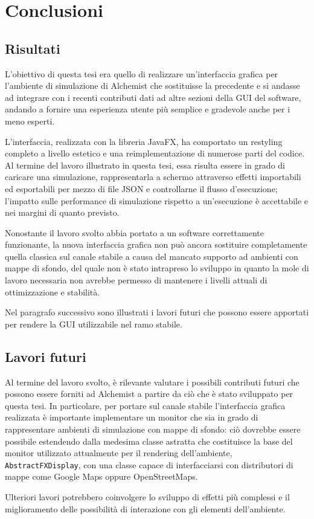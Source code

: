 
\chapter{Conclusioni}\label{ch:conclusioni}
    \section{Risultati}\label{sec:risultati}
        L'obiettivo di questa tesi era quello di realizzare un'interfaccia grafica per l'ambiente di simulazione di Alchemist che sostituisse la precedente e si andasse ad integrare con i recenti contributi dati ad altre sezioni della GUI del software, andando a fornire una esperienza utente più semplice e gradevole anche per i meno esperti.

        L'interfaccia, realizzata con la libreria JavaFX, ha comportato un restyling completo a livello estetico e una reimplementazione di numerose parti del codice.
        Al termine del lavoro illustrato in questa tesi, essa risulta essere in grado di caricare una simulazione, rappresentarla a schermo attraverso effetti importabili ed esportabili per mezzo di file JSON e controllarne il flusso d'esecuzione;
        l'impatto sulle performance di simulazione rispetto a un'esecuzione  è accettabile e nei margini di quanto previsto.

        Nonostante il lavoro svolto abbia portato a un software correttamente funzionante, la nuova interfaccia grafica non può ancora sostituire completamente quella classica sul canale stabile a causa del mancato supporto ad ambienti con mappe di sfondo, del quale non è stato intrapreso lo sviluppo in quanto la mole di lavoro necessaria non avrebbe permesso di mantenere i livelli attuali di ottimizzazione e stabilità.

        Nel paragrafo successivo sono illustrati i lavori futuri che possono essere apportati per rendere la GUI utilizzabile nel ramo stabile.

    \section{Lavori futuri}\label{sec:futuro}
        Al termine del lavoro svolto, è rilevante valutare i possibili contributi futuri che possono essere forniti ad Alchemist a partire da ciò che è stato sviluppato per questa tesi.
        In particolare, per portare sul canale stabile l'interfaccia grafica realizzata è importante implementare un monitor che sia in grado di rappresentare ambienti di simulazione con mappe di sfondo: ciò dovrebbe essere possibile estendendo dalla medesima classe astratta che costituisce la base del monitor utilizzato attualmente per il rendering dell'ambiente, \texttt{AbstractFXDisplay}, con una classe capace di interfacciarsi con distributori di mappe come Google Maps oppure OpenStreetMaps.

        Ulteriori lavori potrebbero coinvolgere lo sviluppo di effetti più complessi e il miglioramento delle possibilità di interazione con gli elementi dell'ambiente.
